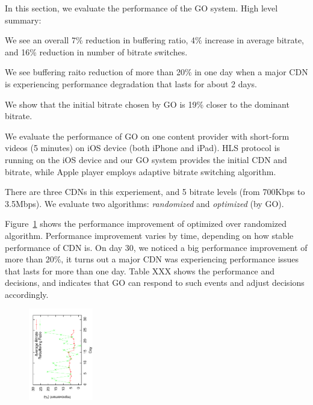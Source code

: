 





In this section, we evaluate the performance of the GO system. High level summary:
\begin{packedenumerate}
    \item We see an overall 7\% reduction in buffering ratio, 4\% increase in average bitrate, and 16\% reduction in number of bitrate switches.
    \item We see buffering raito reduction of more than 20\% in one day when a major CDN is experiencing performance degradation that lasts for about 2 days.
    \item We show that the initial bitrate chosen by GO is 19\% closer to the dominant bitrate.
\end{packedenumerate}


We evaluate the performance of GO on one content provider with short-form videos (5 minutes) on iOS device (both iPhone and iPad). 
HLS protocol is running on the iOS device and our GO system provides the initial CDN and bitrate, while Apple player employs adaptive 
bitrate switching algorithm. 

There are three CDNs in this experiement, and 5 bitrate levels (from 700Kbps to 3.5Mbps). We evaluate two algorithms: {\it randomized} 
and {\it optimized} (by GO).



Figure~\ref{fig:perf-impr} shows the performance improvement of optimized over randomized algorithm. Performance improvement varies by time,
depending on how stable performance of CDN is. On day 30, we noticed a big performance improvement of more than 20\%,
it turns out a major CDN was experiencing performance issues that lasts for more than one day. Table XXX shows the 
performance and decisions, and indicates that GO can respond to such events and adjust decisions accordingly.

\begin{figure}[h!]
\centering
 \includegraphics[width=0.25\textwidth, angle=270] {figures/eval-perfimp.pdf}
\label{fig:perf-impr}
\end{figure}


